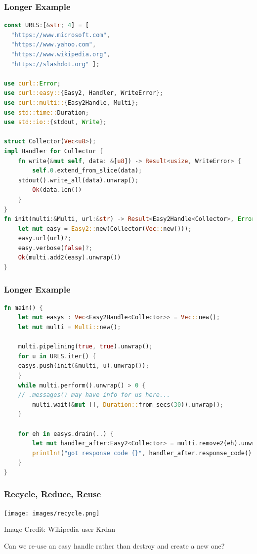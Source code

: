 \begin{frame}[fragile]
\frametitle{Longer Example}

\begin{lstlisting}[language=Rust]
const URLS:[&str; 4] = [
  "https://www.microsoft.com",
  "https://www.yahoo.com",
  "https://www.wikipedia.org",
  "https://slashdot.org" ];

use curl::Error;
use curl::easy::{Easy2, Handler, WriteError};
use curl::multi::{Easy2Handle, Multi};
use std::time::Duration;
use std::io::{stdout, Write};

struct Collector(Vec<u8>);
impl Handler for Collector {
    fn write(&mut self, data: &[u8]) -> Result<usize, WriteError> {
        self.0.extend_from_slice(data);
	stdout().write_all(data).unwrap();
        Ok(data.len())
    }
}
fn init(multi:&Multi, url:&str) -> Result<Easy2Handle<Collector>, Error> {
    let mut easy = Easy2::new(Collector(Vec::new()));
    easy.url(url)?;
    easy.verbose(false)?;
    Ok(multi.add2(easy).unwrap())
}
\end{lstlisting}

\end{frame}


\begin{frame}[fragile]
\frametitle{Longer Example}

\begin{lstlisting}[language=Rust]
fn main() {
    let mut easys : Vec<Easy2Handle<Collector>> = Vec::new();
    let mut multi = Multi::new();
    
    multi.pipelining(true, true).unwrap();
    for u in URLS.iter() {
	easys.push(init(&multi, u).unwrap());
    }
    while multi.perform().unwrap() > 0 {
	// .messages() may have info for us here...
        multi.wait(&mut [], Duration::from_secs(30)).unwrap();
    }

    for eh in easys.drain(..) {
    	let mut handler_after:Easy2<Collector> = multi.remove2(eh).unwrap();
        println!("got response code {}", handler_after.response_code().unwrap());
    }
}
\end{lstlisting}


\end{frame}

\begin{frame}
	\frametitle{Recycle, Reduce, Reuse}

	\begin{center}
		\texttt{[image: images/recycle.png]}
	\end{center}
	\hfill Image Credit: Wikipedia user Krdan

	Can we re-use an easy handle rather than destroy and create a new one?

\end{frame}

